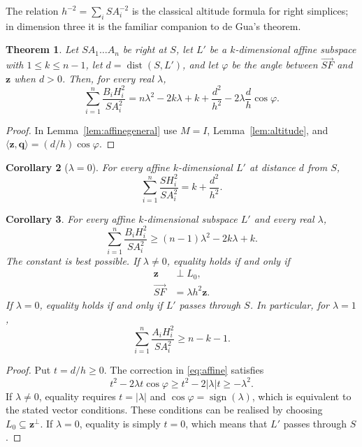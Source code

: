 \documentclass[11pt]{article}
\newtheorem{theorem}{Theorem}[section]
\newtheorem{corollary}[theorem]{Corollary}
\theoremstyle{definition}
\theoremstyle{remark}
\DeclareMathOperator{\dist}{dist}
\newcommand{\bz}{\mathbf z}
\newcommand{\bq}{\mathbf q}
\begin{document}
The relation $h^{-2}=\sum_iSA_i^{-2}$ is the classical altitude formula for right
simplices; in dimension three it is the familiar companion to de Gua's theorem.

\begin{theorem}\label{thm:affine}
Let $SA_1\ldots A_n$ be right at $S$, let $L'$ be a $k$-dimensional affine subspace with
$1\le k\le n-1$, let $d=\dist(S,L')$, and let $\varphi$ be the angle between
$\overrightarrow{SF}$ and $\bz$ when $d>0$. Then, for every real $\lambda$,
\begin{equation}\label{eq:affine}
\sum_{i=1}^{n}\frac{B_iH_i^2}{SA_i^2}
=
n\lambda^2-2k\lambda+k
+\frac{d^2}{h^2}
-2\lambda\frac{d}{h}\cos\varphi.
\end{equation}
\end{theorem}

\begin{proof}
In Lemma~\ref{lem:affinegeneral} use $M=I$, Lemma~\ref{lem:altitude}, and
$\langle\bz,\bq\rangle=(d/h)\cos\varphi$.
\end{proof}

\begin{corollary}[$\lambda=0$]\label{cor:affinezero}
For every affine $k$-dimensional $L'$ at distance $d$ from $S$,
\[
\sum_{i=1}^{n}\frac{SH_i^2}{SA_i^2}=k+\frac{d^2}{h^2}.
\]
\end{corollary}

\begin{corollary}\label{cor:affinelower}
For every affine $k$-dimensional subspace $L'$ and every real $\lambda$,
\[
\sum_{i=1}^{n}\frac{B_iH_i^2}{SA_i^2}
\ge
(n-1)\lambda^2-2k\lambda+k.
\]
The constant is best possible. If $\lambda\ne0$, equality holds if and only if
\[
\begin{aligned}
\bz&\perp L_0,\\
\overrightarrow{SF}&=\lambda h^2\bz.
\end{aligned}
\]
If $\lambda=0$, equality holds if and only if $L'$ passes through $S$. In particular, for $\lambda=1$,
\[
\sum_{i=1}^{n}\frac{A_iH_i^2}{SA_i^2}\ge n-k-1.
\]
\end{corollary}

\begin{proof}
Put $t=d/h\ge0$. The correction in \eqref{eq:affine} satisfies
\[
t^2-2\lambda t\cos\varphi
\ge
t^2-2|\lambda|t
\ge
-\lambda^2.
\]
If $\lambda\ne0$, equality requires $t=|\lambda|$ and
$\cos\varphi=\operatorname{sign}(\lambda)$, which is equivalent to the stated vector
conditions. These conditions can be realised by choosing $L_0\subseteq\bz^\perp$. If
$\lambda=0$, equality is simply $t=0$, which means that $L'$ passes through $S$.
\end{proof}
\end{document}

